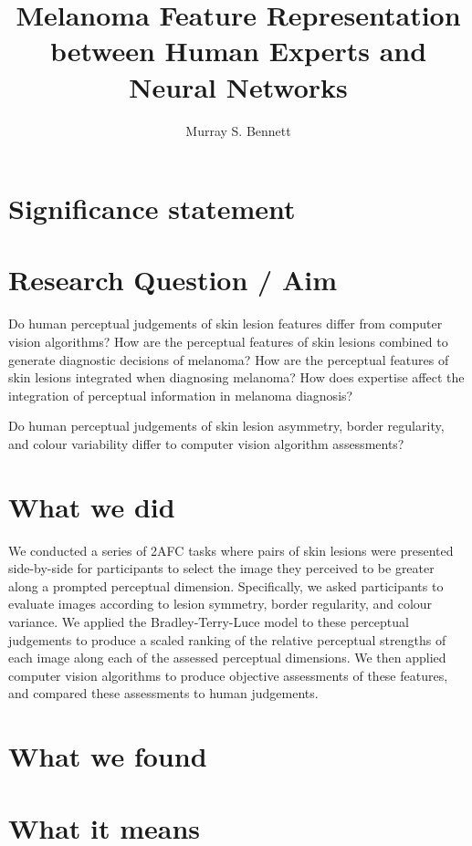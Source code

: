 \documentclass[a4paper, natbib, doc, 12pt]{apa7}
\title{Melanoma Feature Representation between Human Experts and Neural Networks}
\author{Murray S. Bennett}
\begin{document}
\maketitle

\setlength{\parskip}{0pt}


\section{Significance statement}

\newpage
\section{Research Question / Aim}
Do human perceptual judgements of skin lesion features differ from computer vision algorithms?
How are the perceptual features of skin lesions combined to generate diagnostic decisions of melanoma?
How are the perceptual features of skin lesions integrated when diagnosing melanoma?
How does expertise affect the integration of perceptual information in melanoma diagnosis?

Do human perceptual judgements of skin lesion asymmetry, border regularity, and colour variability differ to computer vision algorithm assessments?

\section{What we did}
We conducted a series of 2AFC tasks where pairs of skin lesions were presented side-by-side for participants to select the image they perceived to be greater along a prompted perceptual dimension. Specifically, we asked participants to evaluate images according to lesion symmetry, border regularity, and colour variance. We applied the Bradley-Terry-Luce model to these perceptual judgements to produce a scaled ranking of the relative perceptual strengths of each image along each of the assessed perceptual dimensions. We then applied computer vision algorithms to produce objective assessments of these features, and compared these assessments to human judgements.

\section{What we found}


\section{What it means}
\end{document}
